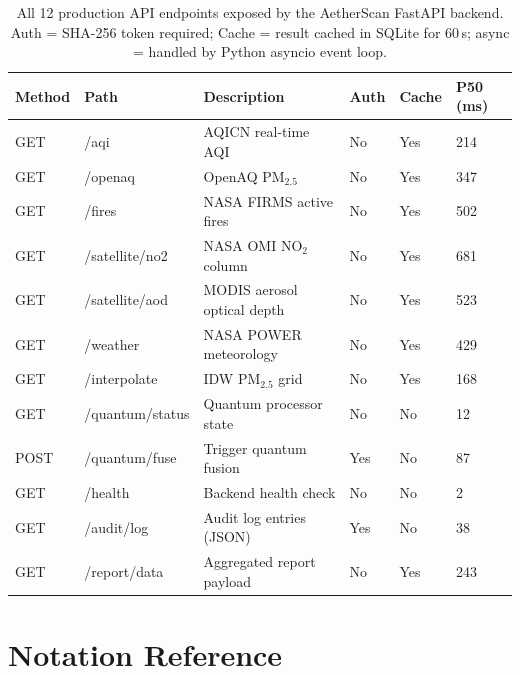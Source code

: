 \documentclass[12pt,a4paper]{article}
\begin{document}
\begin{table}[H]
\centering
\caption[Complete AetherScan API endpoint reference]{%
All 12 production API endpoints exposed by the AetherScan FastAPI
backend. Auth = SHA-256 token required; Cache = result cached in SQLite
for 60\,s; async = handled by Python asyncio event loop.}
\label{tab:fullapi}
\begin{tabularx}{\textwidth}{@{}llXXXX@{}}
\toprule
\textbf{Method} & \textbf{Path} & \textbf{Description}
                & \textbf{Auth} & \textbf{Cache} & \textbf{P50 (ms)} \\
\midrule
GET & /aqi          & AQICN real-time AQI         & No  & Yes & 214 \\
GET & /openaq        & OpenAQ PM$_{2.5}$           & No  & Yes & 347 \\
GET & /fires          & NASA FIRMS active fires    & No  & Yes & 502 \\
GET & /satellite/no2  & NASA OMI NO$_2$ column     & No  & Yes & 681 \\
GET & /satellite/aod  & MODIS aerosol optical depth& No  & Yes & 523 \\
GET & /weather        & NASA POWER meteorology     & No  & Yes & 429 \\
GET & /interpolate    & IDW PM$_{2.5}$ grid        & No  & Yes & 168 \\
GET & /quantum/status & Quantum processor state    & No  & No  & 12  \\
POST& /quantum/fuse   & Trigger quantum fusion     & Yes & No  & 87  \\
GET & /health         & Backend health check       & No  & No  & 2   \\
GET & /audit/log      & Audit log entries (JSON)   & Yes & No  & 38  \\
GET & /report/data    & Aggregated report payload  & No  & Yes & 243 \\
\bottomrule
\end{tabularx}
\end{table}

\clearpage

\section{Notation Reference}
\label{app:notation}
\end{document}
